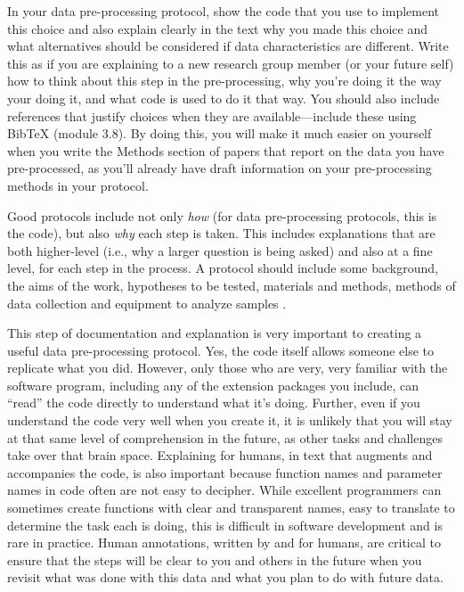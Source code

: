 \documentclass[]{tufte-book}
\begin{document}
In your data pre-processing protocol, show the code that you use to implement
this choice and also explain clearly in the text why you made this choice and
what alternatives should be considered if data characteristics are different.
Write this as if you are explaining to a new research group member (or your
future self) how to think about this step in the pre-processing, why you're
doing it the way your doing it, and what code is used to do it that way. You
should also include references that justify choices when they are
available---include these using BibTeX (module 3.8). By doing this, you will make it much
easier on yourself when you write the Methods section of papers that report on
the data you have pre-processed, as you'll already have draft information on
your pre-processing methods in your protocol.

Good protocols include not only \emph{how} (for data pre-processing protocols, this
is the code), but also \emph{why} each step is taken. This includes explanations that are both higher-level
(i.e., why a larger question is being asked) and also at a fine level, for each
step in the process. A protocol should include some background, the
aims of the work, hypotheses to be tested, materials and methods, methods of
data collection and equipment to analyze samples \citep{al2016protocol}.

This step of documentation and explanation is very important to creating a
useful data pre-processing protocol. Yes, the code itself allows someone else to
replicate what you did. However, only those who are very, very familiar with the
software program, including any of the extension packages you include, can
``read'' the code directly to understand what it's doing. Further, even if you
understand the code very well when you create it, it is unlikely that you will
stay at that same level of comprehension in the future, as other tasks and
challenges take over that brain space. Explaining for humans, in text that
augments and accompanies the code, is also important because function names and
parameter names in code often are not easy to decipher. While excellent
programmers can sometimes create functions with clear and transparent names,
easy to translate to determine the task each is doing, this is difficult in
software development and is rare in practice. Human annotations, written by and
for humans, are critical to ensure that the steps will be clear to you and
others in the future when you revisit what was done with this data and what you
plan to do with future data.
\end{document}

